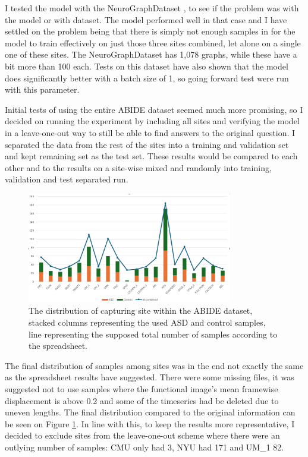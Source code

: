 	I tested the model with the NeuroGraphDataset \cite{said2023neurograph}, to see if the problem was with the model or with dataset. The model performed well in that case and I have settled on the problem being that there is simply not enough samples in for the model to train effectively on just those three sites combined, let alone on a single one of these sites. The NeuroGraphDataset has 1,078 graphs, while these have a bit more than 100 each. Tests on this dataset have also shown that the model does significantly better with a batch size of 1, so going forward test were run with this parameter.
	
	Initial tests of using the entire ABIDE dataset seemed much more promising, so I decided on running the experiment by including all sites and verifying the model in a leave-one-out way to still be able to find answers to the original question. I separated the data from the rest of the sites into a training and validation set and kept remaining set as the test set. These results would be compared to each other and to the results on a site-wise mixed and randomly into training, validation and test separated run.
	
	\begin{figure}[!h]
		\centering
		\includegraphics[width=0.8\textwidth]{figures/abide_samples.png}
		\caption{The distribution of capturing site within the ABIDE dataset, stacked columns representing the used ASD and control samples, line representing the supposed total number of samples according to the spreadsheet.}
		\label{fig:final_distribution}
	\end{figure}
	
	The final distribution of samples among sites was in the end not exactly the same as the spreadsheet results have suggested. There were some missing files, it was suggested not to use samples where the functional image's mean framewise displacement is above 0.2 and some of the timeseries had be deleted due to uneven lengths. The final distribution compared to the original information can be seen on Figure \ref{fig:final_distribution}. In line with this, to keep the results more representative, I decided to exclude sites from the leave-one-out scheme where there were an outlying number of samples: CMU only had 3, NYU had 171 and UM\_1 82.
	
